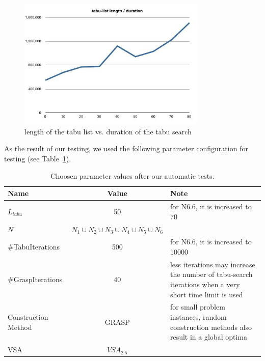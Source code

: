 \documentclass[a4paper,11pt]{article}
\begin{document}
\begin{figure}[h!tb]
  \begin{center}
    \includegraphics[width=0.8\textwidth]{images/tabulist-len-duration}
  \end{center}
  \caption{length of the tabu list vs. duration of the tabu search}
  \label{fig:tabu_len_dur}
\end{figure}

As the result of our testing, we used the following parameter configuration for testing (see Table~\ref{tab:param-1}).

\begin{center}
  \begin{table}[h!tb]
    \begin{tabularx}{\linewidth}{| l | c | X | }
      \hline
      Name & Value & Note \\   \hline     \hline
      $L_{tabu}$ & 50 & for N6.6, it is increased to 70 \\ \hline
      $N$ &  $N_1 \cup N_2 \cup N_3 \cup N_4 \cup N_5 \cup N_6$ &  \\ \hline
      \#TabuIterations & 500  &for N6.6, it is increased to 10000 \\ \hline
      \#GraspIterations &  40 & less iterations may increase the number of tabu-search iterations when a very short time limit is used \\ \hline
      Construction Method & GRASP  & for small problem instances, random construction methods also result in a global optima \\ \hline
      VSA & $VSA_{2.5}$  & \\ \hline
    \end{tabularx}
    \caption{Choosen parameter values after our automatic tests.}
  \label{tab:param-1}
  \end{table}
\end{center}
\end{document}
